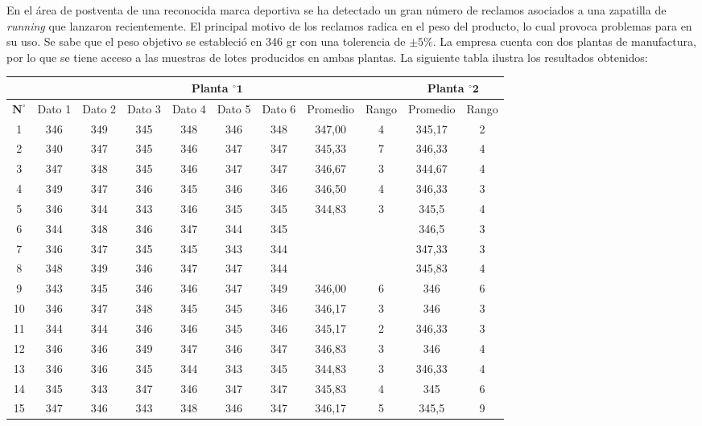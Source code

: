 
\addpoints

\question[47] En el área de postventa de una reconocida marca deportiva se ha detectado un gran número de reclamos asociados a una zapatilla de \textit{running} que lanzaron recientemente. El principal motivo de los reclamos radica en el peso del producto, lo cual provoca problemas para en su uso. Se sabe que el peso objetivo se estableció en 346 gr con una tolerencia de $\pm 5\%$. La empresa cuenta con dos plantas de manufactura, por lo que se tiene acceso a las muestras de lotes producidos en ambas plantas. La siguiente tabla ilustra los resultados obtenidos:

\begin{table}[h!]
\centering
\begin{tabular}{|c|c|c|c|c|c|c|c|c|c|c|}
\cline { 2 - 11 } \multicolumn{1}{c|}{} & \multicolumn{8}{|c|}{ Planta $^{\circ} \mathbf{1}$} & \multicolumn{2}{c|}{ Planta $^{\circ} \mathbf{2}$} \\
\hline $\mathbf{N}^{\circ}$ & Dato 1 & Dato 2 & Dato 3 & Dato 4 & Dato 5 & Dato 6 & Promedio & Rango & Promedio & Rango \\
\hline 1 & 346 & 349 & 345 & 348 & 346 & 348 & 347,00 & 4 & 345,17 & 2 \\
\hline 2 & 340 & 347 & 345 & 346 & 347 & 347 & 345,33 & 7 & 346,33 & 4 \\
\hline 3 & 347 & 348 & 345 & 346 & 347 & 347 & 346,67 & 3 & 344,67 & 4 \\
\hline 4 & 349 & 347 & 346 & 345 & 346 & 346 & 346,50 & 4 & 346,33 & 3 \\
\hline 5 & 346 & 344 & 343 & 346 & 345 & 345 & 344,83 & 3 & 345,5 & 4 \\
\hline 6 & 344 & 348 & 346 & 347 & 344 & 345 & & & 346,5 & 3 \\
\hline 7 & 346 & 347 & 345 & 345 & 343 & 344 & & & 347,33 & 3 \\
\hline 8 & 348 & 349 & 346 & 347 & 347 & 344 & & & 345,83 & 4 \\
\hline 9 & 343 & 345 & 346 & 346 & 347 & 349 & 346,00 & 6 & 346 & 6 \\
\hline 10 & 346 & 347 & 348 & 345 & 345 & 346 & 346,17 & 3 & 346 & 3 \\
\hline 11 & 344 & 344 & 346 & 346 & 345 & 346 & 345,17 & 2 & 346,33 & 3 \\
\hline 12 & 346 & 346 & 349 & 347 & 346 & 347 & 346,83 & 3 & 346 & 4 \\
\hline 13 & 346 & 346 & 345 & 344 & 343 & 345 & 344,83 & 3 & 346,33 & 4 \\
\hline 14 & 345 & 343 & 347 & 346 & 347 & 347 & 345,83 & 4 & 345 & 6 \\
\hline 15 & 347 & 346 & 343 & 348 & 346 & 347 & 346,17 & 5 & 345,5 & 9 \\
\hline
\end{tabular}
\end{table}

